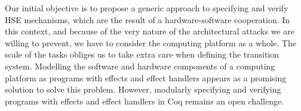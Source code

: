 Our initial objective is to propose a generic approach to specifying and verify
HSE mechanisms, which are the result of a hardware-software cooperation.
%
In this context, and because of the very nature of the architectural attacks we
are willing to prevent, we have to consider the computing platform as a whole.
%
The scale of the tasks obliges us to take extra care when defining the transition
system.
%
Modelling the software and hardware components of a computing platform as
programs with effects and effect handlers appears as a promising solution to
solve this problem.
%
However, modularly specifying and verifying programs with effects and effect
handlers in Coq remains an open challenge.
